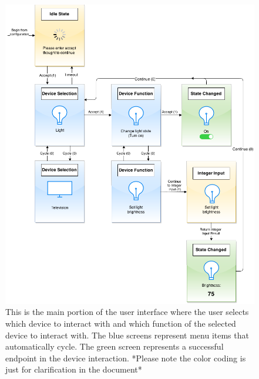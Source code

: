 \documentclass{article}
\begin{document}
\begin{figure}
\includegraphics[width=\textwidth]{ApplicationUI_srs_final.png}

\caption{This is the main portion of the user interface where the user selects which device to interact with and which function of the selected device to interact with. The blue screens represent menu items that automatically cycle. The green screen represents a successful endpoint in the device interaction. *Please note the color coding is just for clarification in the document*}
\label{fig:mockup}
\end{figure}
\end{document}
